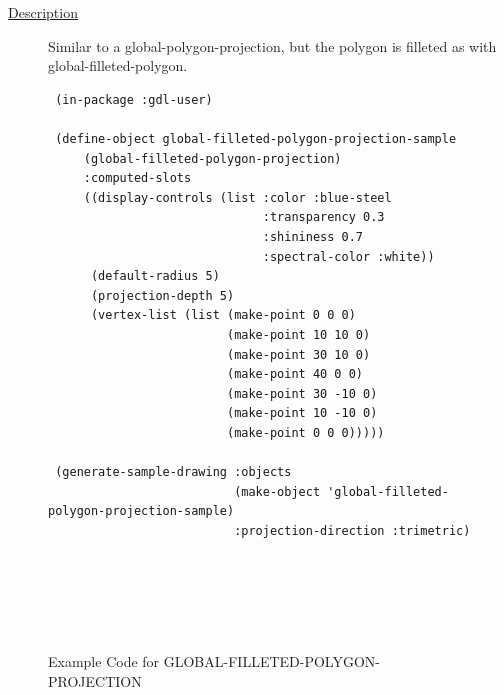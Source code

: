 \documentclass [11pt]{book}
\begin{document}
\begin{itemize}
\begin{description}
\item [
\underline{Description}]


Similar to a global-polygon-projection, but the polygon is filleted
as with global-filleted-polygon.



\end{description}




\begin{figure}
\begin{lrbox}{\boxedverb}
\begin{minipage}{\linewidth}
{\small

\begin{verbatim}
 (in-package :gdl-user)

 (define-object global-filleted-polygon-projection-sample 
     (global-filleted-polygon-projection)
     :computed-slots
     ((display-controls (list :color :blue-steel 
                              :transparency 0.3 
                              :shininess 0.7 
                              :spectral-color :white))
      (default-radius 5)
      (projection-depth 5)
      (vertex-list (list (make-point 0 0 0)
                         (make-point 10 10 0)
                         (make-point 30 10 0)
                         (make-point 40 0 0)
                         (make-point 30 -10 0)
                         (make-point 10 -10 0)
                         (make-point 0 0 0)))))

 (generate-sample-drawing :objects 
                          (make-object 'global-filleted-polygon-projection-sample)
                          :projection-direction :trimetric)






\end{verbatim}}
\end{minipage}
\end{lrbox}
\fbox{\usebox{\boxedverb}}

\caption{Example Code for GLOBAL-FILLETED-POLYGON-PROJECTION}

\label{fig:example-code-GLOBAL-FILLETED-POLYGON-PROJECTION}

\end{figure}


\end{itemize}
\end{document}
